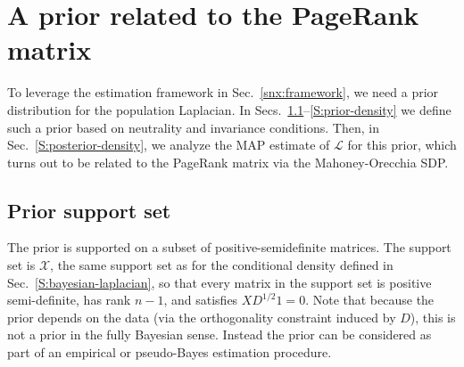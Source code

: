 \documentclass[12pt]{article}
\theoremstyle{plain}
\begin{document}
\section{A prior related to the PageRank matrix}
\label{sxn:priors}


To leverage the estimation framework in Sec.~\ref{snx:framework},
we need a prior distribution for the population Laplacian.  In
Secs.~\ref{S:prior-support}--\ref{S:prior-density} we define such a
prior based on neutrality and invariance conditions.
Then, in Sec.~\ref{S:posterior-density}, we analyze the MAP estimate
of $\mathcal{L}$ for this prior, which turns out to be related to the
PageRank matrix via the Mahoney-Orecchia SDP.


\subsection{Prior support set}
\label{S:prior-support}

The prior is supported on a subset of positive-semidefinite
matrices.  The support set is $\mathcal{X}$, the same support set as
for the conditional density defined in
Sec.~\ref{S:bayesian-laplacian}, so that every matrix in the support
set is positive semi-definite, has rank $n - 1$, and satisfies
$X D^{1/2} 1 = 0$.  Note that because the prior depends on the data
(via the orthogonality constraint induced by $D$), this is not a prior
in the fully Bayesian sense.  Instead the prior can be considered as
part of an empirical or pseudo-Bayes estimation procedure.
\end{document}
